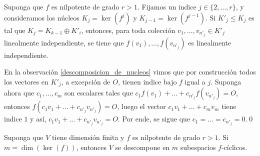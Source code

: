 \begin{lema}\label{independientes_van_a_independientes}
  Suponga que $f$ es nilpotente de grado $r>1$. Fijamos un indice $j\in\{2,\ldots,r\}$, y consideramos los núcleos $K_j=\ker(f^j)$ y $K_{j-1}=\ker(f^{j-1})$. Si $K'_{j}\le K_j$ es tal que $K_j=K_{k-1}\oplus K'_i$, entonces, para toda colección $v_1,\ldots,v_{n'_j}\in K'_j$ linealmente independiente, se tiene que $f(v_1),\ldots,f(v_{n'_j})$ es linealmente independiente.
\end{lema}

\dem En la observación \ref{descomposicion_de_nucleos} vimos que por construcción todos los vectores en $K'_j$, a excepción de $O$, tienen indice bajo $f$ igual a $j$. Suponga ahora que $c_1,\ldots,c_m$ son escalares tales que $c_1f(v_1)+\ldots+c_{n'_j}f(v_{n'_j})=O$, entonces $f(c_1v_1+\ldots+c_{n'_j}v_{n'_j})=O$, luego el vector $c_1v_1+\ldots+c_mv_m$ tiene indice $1$ y así, $c_1v_1+\ldots+c_{n'_j}v_{n'_j}=O$. Por ende, se sigue que $c_1=\ldots=c_{n'_j}=0$.\qed

\begin{teo}\label{formajordannil}
  Suponga que $V$ tiene dimensi\'on finita y $f$ es nilpotente de grado $r>1$. Si $m=\dim\left(\ker(f)\right)$, entonces $V$ se descompone en $m$ subespacios $f$-cíclicos.
\end{teo}

